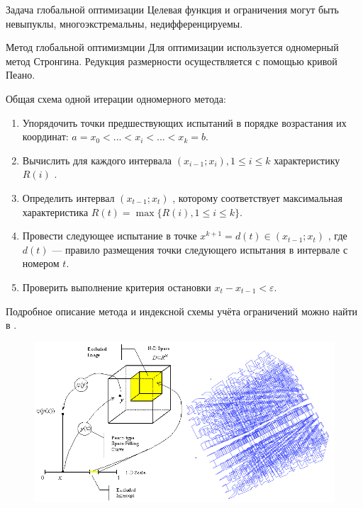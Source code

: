 \documentclass{beamer}
\begin{document}
\begin{frame}[t]
\begin{columns}[t]
\begin{column}[t]{0.48\paperwidth}
\begin{block}{Задача глобальной оптимизации}
              Целевая функция и ограничения могут быть невыпуклы, многоэкстремальны, недифференцируемы.
            \end{block}
            \begin{block}{Метод глобальной оптимизмции}
              Для оптимизации используется одномерный метод Стронгина.
              Редукция размерности осуществляется с помощью кривой Пеано.

              Общая схема одной итерации одномерного метода:
              \begin{enumerate}
                \justifying
                \item Упорядочить точки предшествующих испытаний в порядке возрастания их координат: \(a=x_{0}<...<x_{i}<...<x_{k}=b\).
                \item Вычислить для каждого интервала \((x_{i-1};x_{i}),1\leq i\leq k\)  характеристику \(R(i)\) .
                \item Определить интервал \((x_{t-1};x_{t})\) , которому соответствует максимальная характеристика \(R(t)=\max\{R(i),1\leq i\leq k\}\).
                \item Провести следующее испытание в точке \(x^{k+1}=d(t)\in (x_{t-1};x_{t})\) , где \(d(t)\)  — правило размещения точки следующего испытания в интервале с номером \(t\).
                \item Проверить выполнение критерия остановки \(x_{t}-x_{t-1}<\varepsilon\).
              \end{enumerate}
              Подробное описание метода и индексной схемы учёта ограничений можно найти в \cite{strOptBook}.

              \begin{minipage}[t]{.48\textwidth}
              \begin{figure}
                  \centering
                  \includegraphics[scale=1.27]{images/peano.png}
              \end{figure}
              \end{minipage}


\end{block}
\end{column}
\end{columns}
\end{frame}
\end{document}
